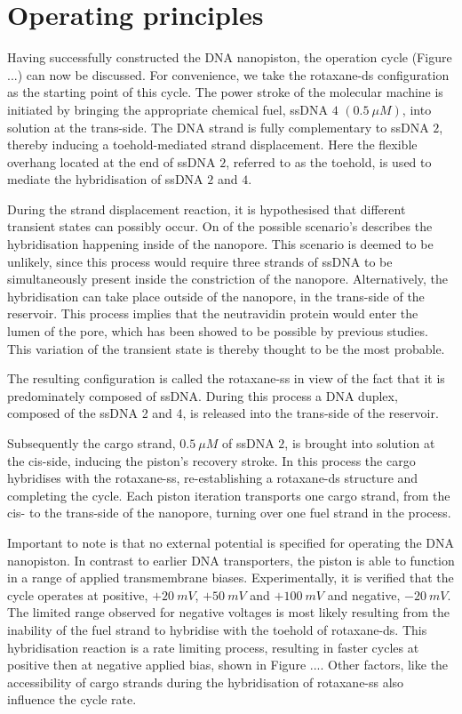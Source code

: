 \section{Operating principles}

Having successfully constructed the DNA nanopiston, the operation cycle (Figure ...) can
now be discussed. For convenience, we take the rotaxane-ds configuration as the starting
point of this cycle. The power stroke of the molecular machine is initiated by bringing
the appropriate chemical fuel, ssDNA $4$ $(0.5\ \mu M)$, into solution at the trans-side.
The DNA strand is fully complementary to ssDNA $2$, thereby inducing a toehold-mediated
strand displacement. Here the flexible overhang located at the end of ssDNA $2$, referred
to as the toehold, is used to mediate the hybridisation of ssDNA $2$ and $4$.

During the strand displacement reaction, it is hypothesised that different transient
states can possibly occur. On of the possible scenario's describes the hybridisation
happening inside of the nanopore. This scenario is deemed to be unlikely, since this
process would require three strands of ssDNA to be simultaneously present inside the
constriction of the nanopore. Alternatively, the hybridisation can take place outside of
the nanopore, in the trans-side of the reservoir. This process implies that the
neutravidin protein would enter the lumen of the pore, which has been showed to be
possible by previous studies. \cite{Lu2018} This variation of the transient state is
thereby thought to be the most probable.

The resulting configuration is called the rotaxane-ss in view of the fact that it is
predominately composed of ssDNA. During this process a DNA duplex, composed of the ssDNA
2 and 4, is released into the trans-side of the reservoir.

Subsequently the cargo strand, $0.5\ \mu M$ of ssDNA $2$,  is brought into solution at
the cis-side, inducing the piston's recovery stroke. In this process the cargo hybridises
with the rotaxane-ss, re-establishing a rotaxane-ds structure and completing the cycle.
Each piston iteration transports one cargo strand, from the cis- to the trans-side of
the nanopore, turning over one fuel strand in the process.

Important to note is that no external potential is specified for operating the DNA
nanopiston. In contrast to earlier DNA transporters, the piston is able to function in a
range of applied transmembrane biases. Experimentally, it is verified that the
cycle operates at positive, $+20\ mV$, $+50\ mV$ and $+100\ mV$ and negative, $ - 20\
mV$. The limited range observed for negative voltages is most likely resulting from the
inability of the fuel strand to hybridise with the toehold of rotaxane-ds. This
hybridisation reaction is a rate limiting process, resulting in faster cycles at positive
then at negative applied bias, shown in Figure .... Other factors, like the accessibility
of cargo strands during the hybridisation of rotaxane-ss also influence the cycle rate.

